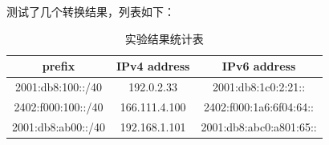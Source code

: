 \documentclass[12pt,letterpaper]{article}
\begin{document}
测试了几个转换结果，列表如下：
\begin{table}[!h]
	\centering
	\caption{\label{res}实验结果统计表}
	\begin{tabular}{|c|c|c|}
		\hline
		prefix & IPv4 address & IPv6 address \\
		\hline
		2001:db8:100::/40 & 192.0.2.33 & 2001:db8:1c0:2:21:: \\
		\hline
		2402:f000:100::/40 & 166.111.4.100 & 2402:f000:1a6:6f04:64:: \\
		\hline
		2001:db8:ab00::/40 & 192.168.1.101 & 2001:db8:abc0:a801:65:: \\
		\hline
	\end{tabular}
\end{table}
\end{document}

